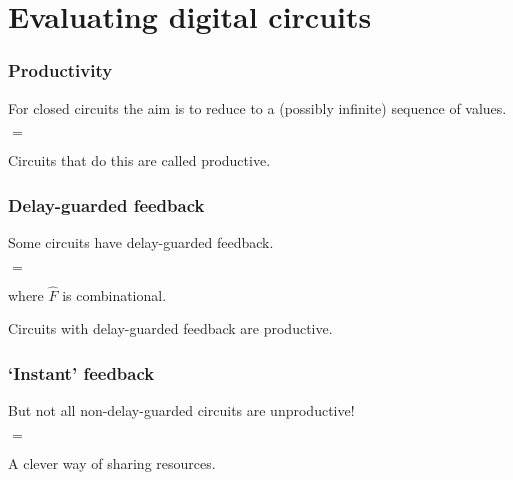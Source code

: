 \section{Evaluating digital circuits}

\begin{frame}
    \frametitle{Productivity}

    For \alert{closed circuits} the aim is to reduce to a (\alert{possibly infinite}) sequence of values.        

    \pause

    \begin{center}
        \quad$=$\quad
    \end{center}


    \pause

    Circuits that do this are called \alert{productive}.

\end{frame}

\begin{frame}
    \frametitle{Delay-guarded feedback}

    Some circuits have \alert{delay-guarded feedback}.

    \pause

    \begin{center}
        \pause
        \quad$=$\quad
    \end{center}

    where $\hat{F}$ is combinational.

    \pause

    \vspace{1em}

    \begin{theorem}
        Circuits with delay-guarded feedback are productive.
    \end{theorem}

\end{frame}

\begin{frame}
    \frametitle{`Instant' feedback}

    But not all non-delay-guarded circuits are unproductive!
    
    \pause

    \begin{center}
        \pause
        \quad$=$\quad
    \end{center}

    \pause

    A clever way of \alert{sharing resources}.

\end{frame}


